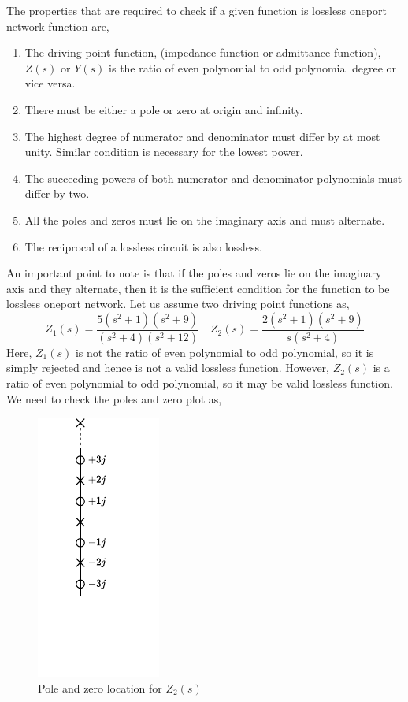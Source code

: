 The properties that are required to check if a given function is lossless oneport network function are,
\begin{enumerate}
    \item The driving point function, (impedance function or admittance function), $Z(s)$ or $Y(s)$ is the ratio of even polynomial to odd polynomial degree or vice versa.
    \item There must be either a pole or zero at origin and infinity.
    \item The highest degree of numerator and denominator must differ by at most unity. Similar condition is necessary for the lowest power.
    \item The succeeding powers of both numerator and denominator polynomials must differ by two. 
    \item All the poles and zeros must lie on the imaginary axis and must alternate.
    \item The reciprocal of a lossless circuit is also lossless.
\end{enumerate}
An important point to note is that if the poles and zeros lie on the imaginary axis and they alternate, then it is the sufficient condition for the function to be lossless oneport network.
Let us assume two driving point functions as,
\begin{equation*}
    Z_1(s)=\frac{5(s^2+1)(s^2+9)}{(s^2+4)(s^2+12)} \quad   Z_2(s)=\frac{2(s^2+1)(s^2+9)}{s(s^2+4)}
\end{equation*}
Here, $Z_1(s)$ is not the ratio of even polynomial to odd polynomial, so it is simply rejected and hence is not a valid lossless function. However, $Z_2(s)$ is a ratio of even polynomial to odd polynomial, so it may be valid lossless function. We need to check the poles and zero plot as,
\begin{figure}[H]
    \centering
    \includegraphics[scale=1.5]{../Figures/pole_lc}
    \caption{Pole and zero location for $Z_2(s)$}
    \label{fig:pole-lc-2}
\end{figure}